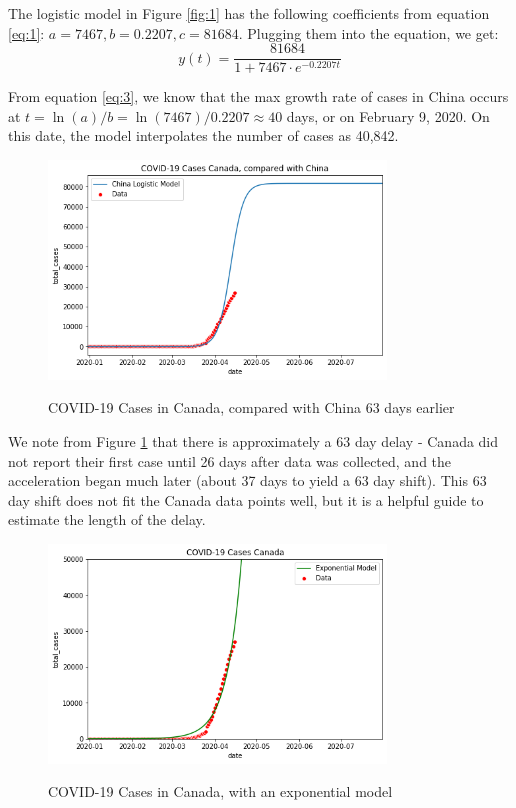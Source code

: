 \documentclass[12pt,a4paper]{article}
\begin{document}
The logistic model in Figure \ref{fig:1} has the following coefficients from equation \ref{eq:1}: $a = 7467, b = 0.2207, c = 81684$. Plugging them into the equation, we get:
\begin{equation} \label{eq:3}
y(t) = \frac{81684}{1 + 7467 \cdot e^{-0.2207t}}
\end{equation}

From equation \ref{eq:3}, we know that the max growth rate of cases in China occurs at $t = \ln(a)/b = \ln(7467)/0.2207 \approx 40$ days, or on February 9, 2020. On this date, the model interpolates the number of cases as 40,842.

\newpage

\begin{figure}[h]
	\caption{COVID-19 Cases in Canada, compared with China 63 days earlier}
    \centering
    \includegraphics[width=0.8\textwidth]{plot2}
    \label{fig:2}
\end{figure}

We note from Figure \ref{fig:2} that there is approximately a 63 day delay - Canada did not report their first case until 26 days after data was collected, and the acceleration began much later (about 37 days to yield a 63 day shift). This 63 day shift does not fit the Canada data points well, but it is a helpful guide to estimate the length of the delay.

\begin{figure}[h]
	\caption{COVID-19 Cases in Canada, with an exponential model}
    \centering
    \includegraphics[width=0.8\textwidth]{plot3}
    \label{fig:3}
\end{figure}
\end{document}
